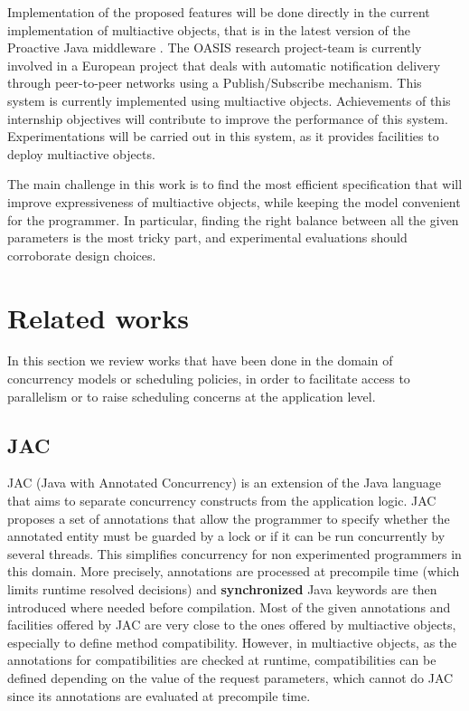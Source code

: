 \documentclass[11pt]{report}
\begin{document}
Implementation of the proposed features will be done directly in the current implementation of multiactive objects, that is in the latest version of the Proactive Java middleware \cite{ref:proactive}.
The OASIS research project-team is currently involved in a European project \cite{ref:play} that deals with automatic notification delivery through peer-to-peer networks using a Publish/Subscribe mechanism. This system is currently implemented using multiactive objects. Achievements of this internship objectives will contribute to improve the performance of this system. Experimentations will be carried out in this system, as it provides facilities to deploy multiactive objects.  

The main challenge in this work is to find the most efficient specification that will improve expressiveness of multiactive objects, while keeping the model convenient for the programmer. In particular, finding the right balance between all the given parameters is the most tricky part, and experimental evaluations should corroborate design choices.

\section{Related works}
In this section we review works that have been done in the domain of concurrency models or scheduling policies, in order to facilitate access to parallelism or to raise scheduling concerns at the application level.
\subsection{JAC}
JAC (Java with Annotated Concurrency) \cite{ref:jac} is an extension of the Java language that aims to separate concurrency constructs from the application logic. JAC proposes a set of annotations that allow the programmer to specify whether the annotated entity must be guarded by a lock or if it can be run concurrently by several threads. This simplifies concurrency for non experimented programmers in this domain. More precisely, annotations are processed at precompile time (which limits runtime resolved decisions) and \textbf{synchronized} Java keywords are then introduced where needed before compilation. Most of the given annotations and facilities offered by JAC are very close to the ones offered by multiactive objects, especially to define method compatibility. However, in multiactive objects, as the annotations for compatibilities are checked at runtime, compatibilities can be defined depending on the value of the request parameters, which cannot do JAC since its annotations are evaluated at precompile time.
\end{document}
